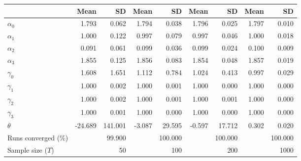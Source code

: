 
\begin{tabular}[t]{lrrrrrrrr}
\toprule
  & Mean & SD & Mean  & SD  & Mean   & SD   & Mean    & SD   \\
\midrule
$\alpha_{0}$ & 1.793 & 0.062 & 1.794 & 0.038 & 1.796 & 0.025 & 1.797 & 0.010\\
$\alpha_{1}$ & 1.000 & 0.122 & 0.997 & 0.079 & 0.997 & 0.046 & 1.000 & 0.018\\
$\alpha_{2}$ & 0.091 & 0.061 & 0.099 & 0.036 & 0.099 & 0.024 & 0.100 & 0.009\\
$\alpha_{3}$ & 1.855 & 0.125 & 1.856 & 0.083 & 1.854 & 0.048 & 1.857 & 0.019\\
$\gamma_{0}$ & 1.608 & 1.651 & 1.112 & 0.784 & 1.024 & 0.413 & 0.997 & 0.029\\
$\gamma_{1}$ & 1.000 & 0.002 & 1.000 & 0.001 & 1.000 & 0.000 & 1.000 & 0.000\\
$\gamma_{2}$ & 1.000 & 0.002 & 1.000 & 0.001 & 1.000 & 0.001 & 1.000 & 0.000\\
$\gamma_{3}$ & 1.000 & 0.001 & 1.000 & 0.000 & 1.000 & 0.000 & 1.000 & 0.000\\
$\theta$ & -24.689 & 141.001 & -3.087 & 29.595 & -0.597 & 17.712 & 0.302 & 0.020\\
Runs converged (\%) &  & 99.900 &  & 100.000 &  & 100.000 &  & 100.000\\
Sample size ($T$) &  & 50 &  & 100 &  & 200 &  & 1000\\
\bottomrule
\end{tabular}
